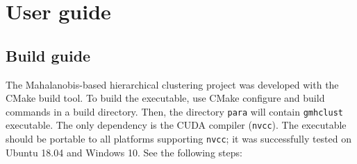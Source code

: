\documentclass[12pt,a4paper,twoside,openright]{report}
\begin{document}



\tableofcontents














\appendix
\chapter{User guide}

\section{Build guide}

The Mahalanobis-based hierarchical clustering project was developed with the CMake build tool. To build the executable, use CMake configure and build commands in a build directory. Then, the directory \texttt{para} will contain \texttt{gmhclust} executable. The only dependency is the CUDA compiler (\texttt{nvcc}). The executable should be portable to all platforms supporting \texttt{nvcc}; it was successfully tested on Ubuntu 18.04 and Windows 10. See the following steps:
\end{document}
